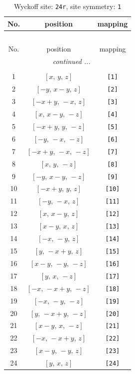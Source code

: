 \documentclass[fleqn,8pt]{jsarticle}
\begin{document}
\begin{longtable}{ccc}
\caption{Wyckoff site: {\tt 24r}, site symmetry: {\tt 1}}
 \\
 \hline \hline
No. & position & mapping \\ \hline \endfirsthead

\multicolumn{2}{l}{\tablename\ \thetable{}} \\
 \hline \hline
No. & position & mapping \\ \hline \endhead

 \hline \hline
\multicolumn{2}{r}{\footnotesize\it continued ...} \\ \endfoot

 \hline \hline
\multicolumn{2}{r}{} \\ \endlastfoot

1 & $\left[ x,\, y,\, z \right]$ & {\tt [1]} \\ \hline
2 & $\left[ - y,\, x - y,\, z \right]$ & {\tt [2]} \\ \hline
3 & $\left[ - x + y,\, - x,\, z \right]$ & {\tt [3]} \\ \hline
4 & $\left[ x,\, x - y,\, - z \right]$ & {\tt [4]} \\ \hline
5 & $\left[ - x + y,\, y,\, - z \right]$ & {\tt [5]} \\ \hline
6 & $\left[ - y,\, - x,\, - z \right]$ & {\tt [6]} \\ \hline
7 & $\left[ - x + y,\, - x,\, - z \right]$ & {\tt [7]} \\ \hline
8 & $\left[ x,\, y,\, - z \right]$ & {\tt [8]} \\ \hline
9 & $\left[ - y,\, x - y,\, - z \right]$ & {\tt [9]} \\ \hline
10 & $\left[ - x + y,\, y,\, z \right]$ & {\tt [10]} \\ \hline
11 & $\left[ - y,\, - x,\, z \right]$ & {\tt [11]} \\ \hline
12 & $\left[ x,\, x - y,\, z \right]$ & {\tt [12]} \\ \hline
13 & $\left[ x - y,\, x,\, z \right]$ & {\tt [13]} \\ \hline
14 & $\left[ - x,\, - y,\, z \right]$ & {\tt [14]} \\ \hline
15 & $\left[ y,\, - x + y,\, z \right]$ & {\tt [15]} \\ \hline
16 & $\left[ x - y,\, - y,\, - z \right]$ & {\tt [16]} \\ \hline
17 & $\left[ y,\, x,\, - z \right]$ & {\tt [17]} \\ \hline
18 & $\left[ - x,\, - x + y,\, - z \right]$ & {\tt [18]} \\ \hline
19 & $\left[ - x,\, - y,\, - z \right]$ & {\tt [19]} \\ \hline
20 & $\left[ y,\, - x + y,\, - z \right]$ & {\tt [20]} \\ \hline
21 & $\left[ x - y,\, x,\, - z \right]$ & {\tt [21]} \\ \hline
22 & $\left[ - x,\, - x + y,\, z \right]$ & {\tt [22]} \\ \hline
23 & $\left[ x - y,\, - y,\, z \right]$ & {\tt [23]} \\ \hline
24 & $\left[ y,\, x,\, z \right]$ & {\tt [24]} \\
\end{longtable}
\end{document}
